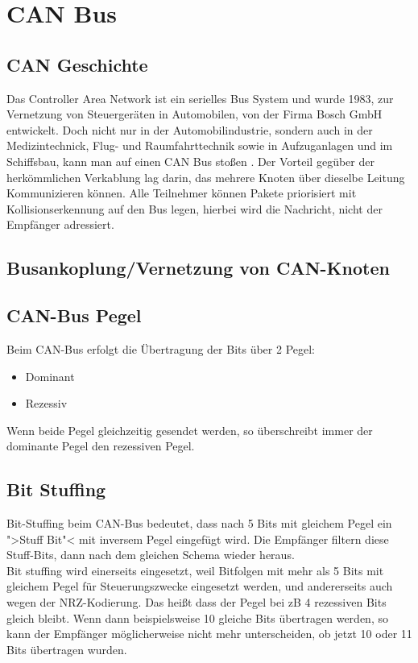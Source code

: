 \section{CAN Bus}

\subsection{CAN Geschichte}
	
Das Controller Area Network ist ein serielles Bus System und wurde
1983, zur Vernetzung von Steuergeräten in Automobilen, von der Firma
Bosch GmbH entwickelt. Doch nicht nur in der Automobilindustrie,
sondern auch in der Medizintechnick, Flug- und Raumfahrttechnik sowie
in Aufzuganlagen und im Schiffsbau, kann man auf einen CAN Bus stoßen
\citep[nach][]{WI1}. Der Vorteil gegüber der herkömmlichen Verkablung
lag darin, das mehrere Knoten über dieselbe Leitung Kommunizieren
können. Alle Teilnehmer können Pakete priorisiert mit
Kollisionserkennung auf den Bus legen, hierbei wird die Nachricht,
nicht der Empfänger adressiert.
	
\subsection{Busankoplung/Vernetzung von CAN-Knoten}
	
\subsection{CAN-Bus Pegel} Beim CAN-Bus erfolgt die Übertragung der
Bits über 2 Pegel: 
\begin{itemize} 
\item Dominant 
\item Rezessiv
\end{itemize}

Wenn beide Pegel gleichzeitig gesendet werden, so überschreibt immer
der dominante Pegel den rezessiven Pegel.
	
\subsection{Bit Stuffing} 
Bit-Stuffing beim CAN-Bus bedeutet, dass
nach 5 Bits mit gleichem Pegel ein ">Stuff Bit"< mit inversem Pegel
eingefügt wird. Die Empfänger filtern diese Stuff-Bits, dann nach dem
gleichen Schema wieder heraus.
\\ Bit stuffing wird einerseits
eingesetzt, weil Bitfolgen mit mehr als 5 Bits mit gleichem Pegel für
Steuerungszwecke eingesetzt werden, und andererseits auch wegen der
NRZ-Kodierung. Das heißt dass der Pegel bei zB 4 rezessiven Bits
gleich bleibt. Wenn dann beispielsweise 10 gleiche Bits übertragen
werden, so kann der Empfänger möglicherweise nicht mehr unterscheiden,
ob jetzt 10 oder 11 Bits übertragen wurden.
	
